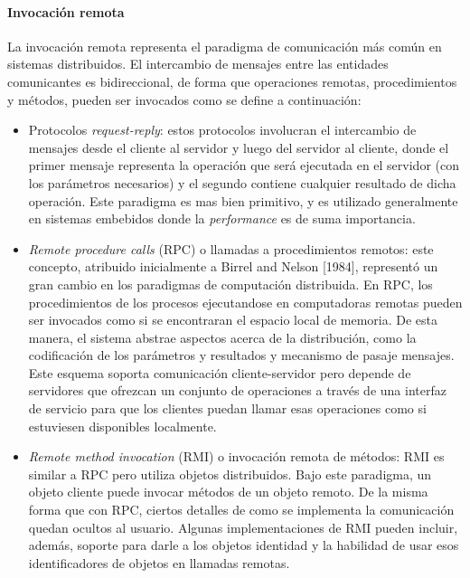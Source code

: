 \documentclass[a4paper,10pt, oneside]{article}
\begin{document}
\paragraph{Invocación remota}
La invocación remota representa el paradigma de comunicación más común en sistemas distribuidos. El intercambio de mensajes entre las entidades comunicantes es bidireccional, de forma que operaciones remotas, procedimientos y métodos, pueden ser invocados como se define a continuación:
\begin{itemize}
	\item Protocolos \textit{request-reply}: estos protocolos involucran el intercambio de mensajes desde el cliente al servidor y luego del servidor al cliente, donde el primer mensaje representa la operación que será ejecutada en el servidor (con los parámetros necesarios) y el segundo contiene cualquier resultado de dicha operación. Este paradigma es mas bien primitivo, y es utilizado generalmente en sistemas embebidos donde la \textit{performance} es de suma importancia.
	\item \textit{Remote procedure calls} (RPC) o llamadas a procedimientos remotos: este concepto, atribuido inicialmente a Birrel and Nelson [1984], representó un gran cambio en los paradigmas de computación distribuida. En RPC, los procedimientos de los procesos ejecutandose en computadoras remotas pueden ser invocados como si se encontraran el espacio local de memoria. De esta manera, el sistema abstrae aspectos acerca de la distribución, como la codificación de los parámetros y resultados y mecanismo de pasaje mensajes. Este esquema soporta comunicación cliente-servidor pero depende de servidores que ofrezcan un conjunto de operaciones a través de una interfaz de servicio para que los clientes puedan llamar esas operaciones como si estuviesen disponibles localmente.
	\item \textit{Remote method invocation} (RMI) o invocación remota de métodos: RMI es similar a RPC pero utiliza objetos distribuidos. Bajo este paradigma, un objeto cliente puede invocar métodos de un objeto remoto. De la misma forma que con RPC, ciertos detalles de como se implementa la comunicación quedan ocultos al usuario. Algunas implementaciones de RMI pueden incluir, además, soporte para darle a los objetos identidad y la habilidad de usar esos identificadores de objetos en llamadas remotas.
\end{itemize}
\end{document}
